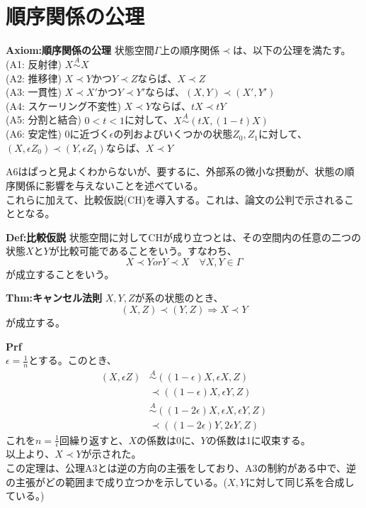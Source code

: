 \documentclass[a4paper,11pt]{jsarticle}
\begin{document}
\section{順序関係の公理}
\begin{itembox}[l]{\textbf{Axiom:順序関係の公理}}
    状態空間$\Gamma$上の順序関係$\prec$は、以下の公理を満たす。\\
    (A1: 反射律) $ X \overset{A}{\sim} X$\\
    (A2: 推移律) $X \prec Y$かつ$Y \prec Z$ならば、$X \prec Z$\\
    (A3: 一貫性) $X \prec X'$かつ$Y \prec Y'$ならば、$(X,Y) \prec (X',Y')$\\
    (A4: スケーリング不変性) $X \prec Y$ならば、$tX \prec tY$\\
    (A5: 分割と結合) $0<t<1$に対して、$X \overset{A}{\sim} (tX,(1-t)X)$\\
    (A6: 安定性) 0に近づく$\epsilon$の列およびいくつかの状態$Z_0,Z_1$に対して、$(X,\epsilon Z_0) \prec (Y,\epsilon Z_1)$ならば、$X \prec Y$ 
\end{itembox}
A6はぱっと見よくわからないが、要するに、外部系の微小な摂動が、状態の順序関係に影響を与えないことを述べている。\\
これらに加えて、比較仮説(CH)を導入する。これは、論文の公判で示されることとなる。\\
\begin{itembox}[l]{\textbf{Def:比較仮説}}
    状態空間に対してCHが成り立つとは、その空間内の任意の二つの状態$X$と$Y$が比較可能であることをいう。すなわち、
    \begin{equation}
        X \prec Y or Y \prec X \quad \forall X,Y \in \Gamma
    \end{equation}
    が成立することをいう。

\end{itembox}

\begin{itembox}[l]{\textbf{Thm:キャンセル法則}}
    $X,Y,Z$が系の状態のとき、
    \begin{equation}
        (X,Z) \prec (Y,Z) \Rightarrow X \prec Y
    \end{equation}
    が成立する。

\end{itembox}
\textbf{Prf}\\
$\epsilon =\frac{1}{n}$とする。このとき、
\begin{align}
    (X,\epsilon Z) &\overset{A}{\sim} ((1-\epsilon)X,\epsilon X,Z)\\
    &\prec ((1-\epsilon)X,\epsilon Y,Z)\\
    &\overset{A}{\sim} ((1-2\epsilon)X,\epsilon X,\epsilon Y,Z)\\
    &\prec ((1-2\epsilon)Y,2\epsilon Y,Z)
    \end{align}
これを$n=\frac{1}{\epsilon}$回繰り返すと、$X$の係数は0に、$Y$の係数は1に収束する。\\
以上より、$X \prec Y$が示された。\qedsymbol\\
この定理は、公理A3とは逆の方向の主張をしており、A3の制約がある中で、逆の主張がどの範囲まで成り立つかを示している。($X,Y$に対して同じ系を合成している。)
\end{document}
